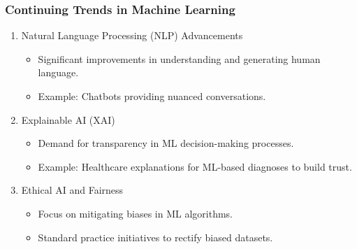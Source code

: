 \documentclass[aspectratio=169]{beamer}
\begin{document}
\begin{frame}
  \frametitle{Continuing Trends in Machine Learning}
  \begin{enumerate}[resume]
    \item Natural Language Processing (NLP) Advancements
      \begin{itemize}
        \item Significant improvements in understanding and generating human language.
        \item Example: Chatbots providing nuanced conversations.
      \end{itemize}
    
    \item Explainable AI (XAI)
      \begin{itemize}
        \item Demand for transparency in ML decision-making processes.
        \item Example: Healthcare explanations for ML-based diagnoses to build trust.
      \end{itemize}
    
    \item Ethical AI and Fairness
      \begin{itemize}
        \item Focus on mitigating biases in ML algorithms.
        \item Standard practice initiatives to rectify biased datasets.
      \end{itemize}
  \end{enumerate}
\end{frame}
\end{document}
